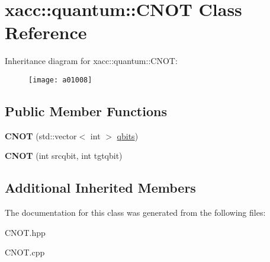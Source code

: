 \hypertarget{a01008}{}\section{xacc\+:\+:quantum\+:\+:C\+N\+OT Class Reference}
\label{a01008}
Inheritance diagram for xacc\+:\+:quantum\+:\+:C\+N\+OT\+:\begin{figure}[H]
\begin{center}
\leavevmode
\texttt{[image: a01008]}
\end{center}
\end{figure}
\subsection*{Public Member Functions}
\begin{DoxyCompactItemize}
\item 
\mbox{\label{a01008_ad3d460779a27affa317dd4f3a88268b3}} 
{\bfseries C\+N\+OT} (std\+::vector$<$ int $>$ \hyperlink{a00992_a2a56be6c2519ea65df4d06f4abae1393}{qbits})
\item 
\mbox{\label{a01008_a15efcb44477dde4b6151fe1776a73ddc}} 
{\bfseries C\+N\+OT} (int srcqbit, int tgtqbit)
\end{DoxyCompactItemize}
\subsection*{Additional Inherited Members}


The documentation for this class was generated from the following files\+:\begin{DoxyCompactItemize}
\item 
C\+N\+O\+T.\+hpp\item 
C\+N\+O\+T.\+cpp\end{DoxyCompactItemize}
